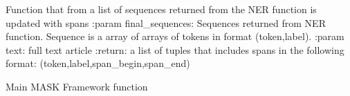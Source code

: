 \documentclass[letterpaper,10pt,english]{sphinxmanual}
\begin{document}

\begin{fulllineitems}
\label{\detokenize{contents:mask_framework.consolidate_NER_results}}
Function that from a list of sequences returned from the NER function is updated with spans
:param final\_sequences: Sequences returned from NER function. Sequence is a array of arrays of tokens in format (token,label).
:param text: full text article
:return: a list of tuples that includes spans in the following format: (token,label,span\_begin,span\_end)

\end{fulllineitems}


\begin{fulllineitems}
\label{\detokenize{contents:mask_framework.main}}
Main MASK Framework function

\end{fulllineitems}

\end{document}
